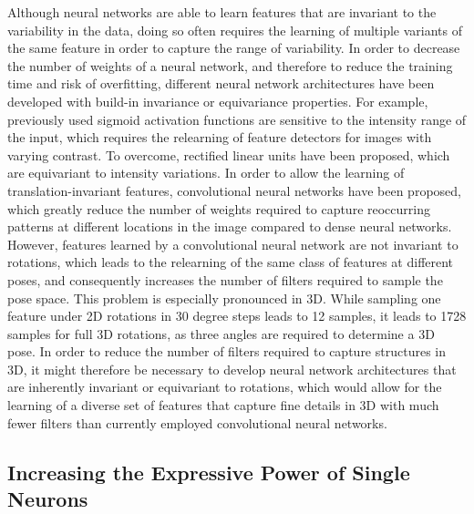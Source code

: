Although neural networks are able to learn features that are invariant to the
variability in the data, doing so often requires the learning of multiple
variants of the same feature in order to capture the range of variability. In
order to decrease the number of weights of a neural network, and therefore to
reduce the training time and risk of overfitting, different neural network
architectures have been developed with build-in invariance or equivariance
properties. For example, previously used sigmoid activation functions are
sensitive to the intensity range of the input, which requires the relearning of
feature detectors for images with varying contrast. To overcome, rectified
linear units have been proposed, which are equivariant to intensity variations.
In order to allow the learning of translation-invariant features, convolutional
neural networks have been proposed, which greatly reduce the number of weights
required to capture reoccurring patterns at different locations in the image
compared to dense neural networks. However, features learned by a convolutional
neural network are not invariant to rotations, which leads to the relearning of
the same class of features at different poses, and consequently increases the
number of filters required to sample the pose space. This problem is especially
pronounced in 3D. While sampling one feature under 2D rotations in 30 degree
steps leads to 12 samples, it leads to 1728 samples for full 3D rotations, as
three angles are required to determine a 3D pose. In order to reduce the number
of filters required to capture structures in 3D, it might therefore be
necessary to develop neural network architectures that are inherently invariant
or equivariant to rotations, which would allow for the learning of a diverse set
of features that capture fine details in 3D with much fewer filters than
currently employed convolutional neural networks.

\subsection[Increasing the expressive power of single neurons]{Increasing the
Expressive Power of Single Neurons}

